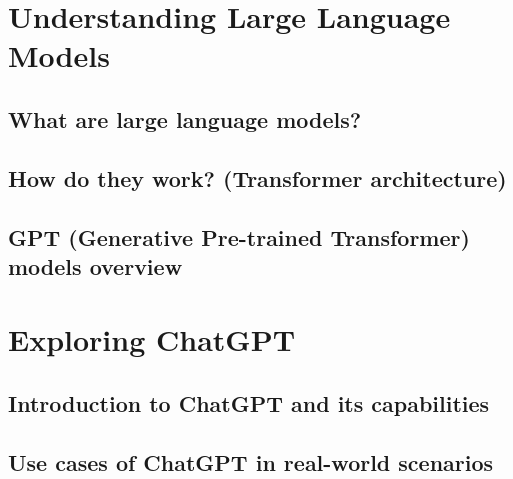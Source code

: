 \documentclass[
]{book}
\begin{document}
\hypertarget{understanding-large-language-models}{%
\chapter*{Understanding Large Language Models}\label{understanding-large-language-models}}

\hypertarget{what-are-large-language-models}{%
\section*{What are large language models?}\label{what-are-large-language-models}}

\hypertarget{how-do-they-work-transformer-architecture}{%
\section*{How do they work? (Transformer architecture)}\label{how-do-they-work-transformer-architecture}}

\hypertarget{gpt-generative-pre-trained-transformer-models-overview}{%
\section*{GPT (Generative Pre-trained Transformer) models overview}\label{gpt-generative-pre-trained-transformer-models-overview}}

\hypertarget{exploring-chatgpt}{%
\chapter*{Exploring ChatGPT}\label{exploring-chatgpt}}

\hypertarget{introduction-to-chatgpt-and-its-capabilities}{%
\section*{Introduction to ChatGPT and its capabilities}\label{introduction-to-chatgpt-and-its-capabilities}}

\hypertarget{use-cases-of-chatgpt-in-real-world-scenarios}{%
\section*{Use cases of ChatGPT in real-world scenarios}\label{use-cases-of-chatgpt-in-real-world-scenarios}}
\end{document}
